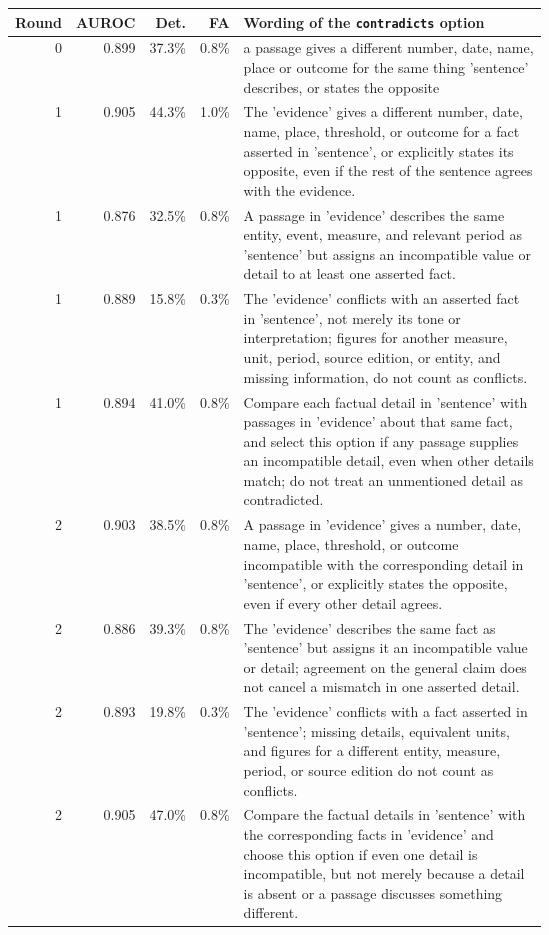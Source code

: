 \begin{tabular}{@{}rrrrp{0.62\linewidth}@{}}
\toprule
Round & AUROC & Det. & FA & Wording of the \texttt{contradicts} option \\
\midrule
0 & 0.899 & 37.3\% & 0.8\% & a passage gives a different number, date, name, place or outcome for the same thing 'sentence' describes, or states the opposite \\
1 & 0.905 & 44.3\% & 1.0\% & The 'evidence' gives a different number, date, name, place, threshold, or outcome for a fact asserted in 'sentence', or explicitly states its opposite, even if the rest of the sentence agrees with the evidence. \\
1 & 0.876 & 32.5\% & 0.8\% & A passage in 'evidence' describes the same entity, event, measure, and relevant period as 'sentence' but assigns an incompatible value or detail to at least one asserted fact. \\
1 & 0.889 & 15.8\% & 0.3\% & The 'evidence' conflicts with an asserted fact in 'sentence', not merely its tone or interpretation; figures for another measure, unit, period, source edition, or entity, and missing information, do not count as conflicts. \\
1 & 0.894 & 41.0\% & 0.8\% & Compare each factual detail in 'sentence' with passages in 'evidence' about that same fact, and select this option if any passage supplies an incompatible detail, even when other details match; do not treat an unmentioned detail as contradicted. \\
2 & 0.903 & 38.5\% & 0.8\% & A passage in 'evidence' gives a number, date, name, place, threshold, or outcome incompatible with the corresponding detail in 'sentence', or explicitly states the opposite, even if every other detail agrees. \\
2 & 0.886 & 39.3\% & 0.8\% & The 'evidence' describes the same fact as 'sentence' but assigns it an incompatible value or detail; agreement on the general claim does not cancel a mismatch in one asserted detail. \\
2 & 0.893 & 19.8\% & 0.3\% & The 'evidence' conflicts with a fact asserted in 'sentence'; missing details, equivalent units, and figures for a different entity, measure, period, or source edition do not count as conflicts. \\
2 & 0.905 & 47.0\% & 0.8\% & Compare the factual details in 'sentence' with the corresponding facts in 'evidence' and choose this option if even one detail is incompatible, but not merely because a detail is absent or a passage discusses something different. \\

\end{tabular}
